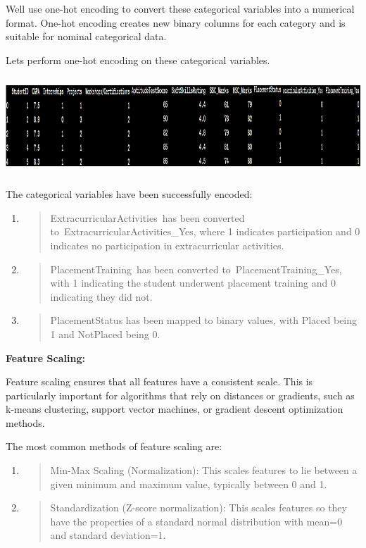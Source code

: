\documentclass[]{article}
\begin{document}
We\textquotesingle ll use one-hot encoding to convert these categorical
variables into a numerical format. One-hot encoding creates new binary
columns for each category and is suitable for nominal categorical data.

Let\textquotesingle s perform one-hot encoding on these categorical
variables.

\includegraphics[width=5.26806in,height=1.43958in]{image5.png}

The categorical variables have been successfully encoded:

\begin{enumerate}
\def\labelenumi{\arabic{enumi}.}
\item
  \begin{quote}
  ExtracurricularActivities~has been converted
  to~ExtracurricularActivities\_Yes, where 1 indicates participation and
  0 indicates no participation in extracurricular activities.
  \end{quote}
\item
  \begin{quote}
  PlacementTraining~has been converted to~PlacementTraining\_Yes, with 1
  indicating the student underwent placement training and 0 indicating
  they did not.
  \end{quote}
\item
  \begin{quote}
  PlacementStatus has been mapped to binary values, with
  \textquotesingle Placed\textquotesingle{} being 1 and
  \textquotesingle NotPlaced\textquotesingle{} being 0.
  \end{quote}
\end{enumerate}

\textbf{Feature Scaling:}

Feature scaling ensures that all features have a consistent scale. This
is particularly important for algorithms that rely on distances or
gradients, such as k-means clustering, support vector machines, or
gradient descent optimization methods.

The most common methods of feature scaling are:

\begin{enumerate}
\def\labelenumi{\arabic{enumi}.}
\item
  \begin{quote}
  Min-Max Scaling (Normalization): This scales features to lie between a
  given minimum and maximum value, typically between 0 and 1.
  \end{quote}
\item
  \begin{quote}
  Standardization (Z-score normalization): This scales features so they
  have the properties of a standard normal distribution with
  mean=0 and standard deviation=1.
  \end{quote}
\end{enumerate}
\end{document}
